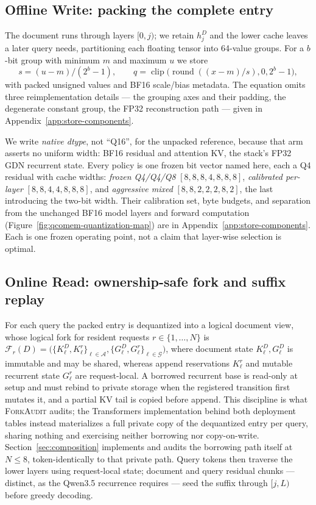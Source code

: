 \documentclass{article}
\newcommand{\method}{\textsc{ForkAudit}}
\begin{document}
\subsection{Offline Write: packing the complete entry}
\label{sec:write}

The document runs through layers $[0,j)$; we retain $h_j^D$ and the lower cache
leaves a later query needs, partitioning each floating tensor into 64-value
groups.  For a $b$-bit group with minimum $m$ and maximum $u$ we store
\begin{equation}
 s=(u-m)/(2^b-1),\qquad q=\operatorname{clip}
 \bigl(\operatorname{round}((x-m)/s),0,2^b-1\bigr),
 \label{eq:quant}
\end{equation}
with packed unsigned values and BF16 scale/bias metadata.  The equation omits
three reimplementation details --- the grouping axes and their padding, the
degenerate constant group, the FP32 reconstruction path --- given in
Appendix~\ref{app:store-components}.

We write \emph{native dtype}, not ``Q16'', for the unpacked reference, because
that arm asserts no uniform width: BF16 residual and attention KV, the stack's
FP32 GDN recurrent state.  Every policy is one frozen bit vector named here,
each a Q4 residual with cache widths: \emph{frozen Q4/Q4/Q8}
$[8,8,8,4,8,8,8]$, \emph{calibrated per-layer} $[8,8,4,4,8,8,8]$, and
\emph{aggressive mixed} $[8,8,2,2,2,8,2]$, the last introducing the two-bit
width.  Their calibration set, byte budgets, and separation from the unchanged BF16
model layers and forward computation
(Figure~\ref{fig:qcomem-quantization-map}) are in
Appendix~\ref{app:store-components}.  Each is one frozen operating point, not a
claim that layer-wise selection is optimal.

\subsection{Online Read: ownership-safe fork and suffix replay}
\label{sec:read}

For each query the packed entry is dequantized into a logical document view,
whose logical fork for resident requests \(r\in\{1,\ldots,N\}\) is
\(\mathcal{F}_r(D)=\bigl(\{K^D_\ell,K^r_\ell\}_{\ell\in\mathcal A},
\{G^D_\ell,G^r_\ell\}_{\ell\in\mathcal G}\bigr)\), where document state
\(K^D_\ell,G^D_\ell\) is immutable and may be shared, whereas append
reservations \(K^r_\ell\) and mutable recurrent state \(G^r_\ell\) are
request-local. A borrowed recurrent base is read-only at setup and must rebind to private storage when
the registered transition first mutates it, and a partial KV tail is copied
before append. This discipline is what \method{} audits; the Transformers
implementation behind both deployment tables instead materializes a full
private copy of the dequantized entry per query, sharing nothing and exercising
neither borrowing nor copy-on-write.  Section~\ref{sec:composition}
implements and audits the borrowing path itself at $N\leq8$, token-identically to
that private path. Query tokens then traverse the
lower layers using request-local state; document and query residual chunks ---
distinct, as the Qwen3.5 recurrence requires --- seed the suffix through
$[j,L)$ before greedy decoding.
\end{document}
